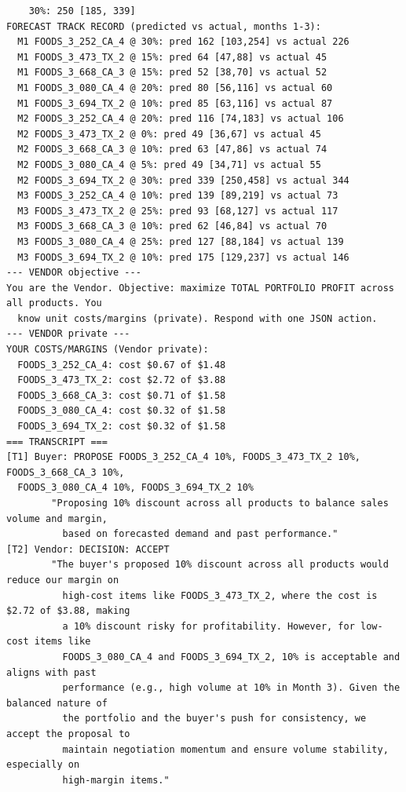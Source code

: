 {\begin{verbatim}
    30%: 250 [185, 339]
FORECAST TRACK RECORD (predicted vs actual, months 1-3):
  M1 FOODS_3_252_CA_4 @ 30%: pred 162 [103,254] vs actual 226
  M1 FOODS_3_473_TX_2 @ 15%: pred 64 [47,88] vs actual 45
  M1 FOODS_3_668_CA_3 @ 15%: pred 52 [38,70] vs actual 52
  M1 FOODS_3_080_CA_4 @ 20%: pred 80 [56,116] vs actual 60
  M1 FOODS_3_694_TX_2 @ 10%: pred 85 [63,116] vs actual 87
  M2 FOODS_3_252_CA_4 @ 20%: pred 116 [74,183] vs actual 106
  M2 FOODS_3_473_TX_2 @ 0%: pred 49 [36,67] vs actual 45
  M2 FOODS_3_668_CA_3 @ 10%: pred 63 [47,86] vs actual 74
  M2 FOODS_3_080_CA_4 @ 5%: pred 49 [34,71] vs actual 55
  M2 FOODS_3_694_TX_2 @ 30%: pred 339 [250,458] vs actual 344
  M3 FOODS_3_252_CA_4 @ 10%: pred 139 [89,219] vs actual 73
  M3 FOODS_3_473_TX_2 @ 25%: pred 93 [68,127] vs actual 117
  M3 FOODS_3_668_CA_3 @ 10%: pred 62 [46,84] vs actual 70
  M3 FOODS_3_080_CA_4 @ 25%: pred 127 [88,184] vs actual 139
  M3 FOODS_3_694_TX_2 @ 10%: pred 175 [129,237] vs actual 146
--- VENDOR objective ---
You are the Vendor. Objective: maximize TOTAL PORTFOLIO PROFIT across all products. You
  know unit costs/margins (private). Respond with one JSON action.
--- VENDOR private ---
YOUR COSTS/MARGINS (Vendor private):
  FOODS_3_252_CA_4: cost $0.67 of $1.48
  FOODS_3_473_TX_2: cost $2.72 of $3.88
  FOODS_3_668_CA_3: cost $0.71 of $1.58
  FOODS_3_080_CA_4: cost $0.32 of $1.58
  FOODS_3_694_TX_2: cost $0.32 of $1.58
=== TRANSCRIPT ===
[T1] Buyer: PROPOSE FOODS_3_252_CA_4 10%, FOODS_3_473_TX_2 10%, FOODS_3_668_CA_3 10%,
  FOODS_3_080_CA_4 10%, FOODS_3_694_TX_2 10%
        "Proposing 10% discount across all products to balance sales volume and margin,
          based on forecasted demand and past performance."
[T2] Vendor: DECISION: ACCEPT
        "The buyer's proposed 10% discount across all products would reduce our margin on
          high-cost items like FOODS_3_473_TX_2, where the cost is $2.72 of $3.88, making
          a 10% discount risky for profitability. However, for low-cost items like
          FOODS_3_080_CA_4 and FOODS_3_694_TX_2, 10% is acceptable and aligns with past
          performance (e.g., high volume at 10% in Month 3). Given the balanced nature of
          the portfolio and the buyer's push for consistency, we accept the proposal to
          maintain negotiation momentum and ensure volume stability, especially on
          high-margin items."
\end{verbatim}
}